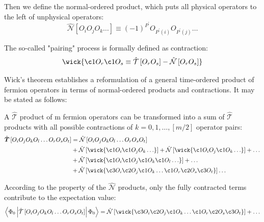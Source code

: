 Then we define the normal-ordered product, which puts all physical operators to the left of unphysical operators:
\begin{equation}
	\hat{\mathcal{N}}\left[O_{i} O_{j} O_{k} \ldots\right] \equiv(-1)^{P^{\prime}} O_{P^{\prime}(i)} O_{P^{\prime}(j)} \ldots
\end{equation}

The so-called "pairing" process is formally defined as contraction:
\begin{equation}
	\wick{
		\c1 O_{r} \c1 O_{s} \equiv \hat{\mathcal{T}}\left[O_{r} O_{s}\right]-\hat{\mathcal{N}}\left[O_{r} O_{s}\right]
	}
\end{equation}

Wick's theorem \cite{wickproof} establishes a reformulation of a general time-ordered product
of fermion operators in terms of normal-ordered products and contractions. It may be stated as follows:

A $\hat{\mathcal{T}}$ product of m fermion operators can be transformed into a sum of $\hat{\mathcal{T}}$ products with all possible contractions of $k = 0, 1, \dots, [m/2]$ operator pairs:
\begin{equation}
	\begin{aligned}
		\hat{\boldsymbol{T}}\left[O_{i} O_{j} O_{k} O_{l} \ldots O_{r} O_{s} O_{t}\right]&=
		\hat{\mathcal{N}}\left[O_{i} O_{j} O_{k} O_{l} \ldots O_{r} O_{s} O_{t}\right]
		\\
		&+\hat{\mathcal{N}}\left[\wick{\c1 O_{i} \c1 O_{j} O_{k} \ldots}\right] +\hat{\mathcal{N}}\left[\wick{\c1 O_{i} O_{j} \c1 O_{k} \ldots}\right]+\ldots
		\\
		&+\hat{\mathcal{N}}\left[\wick{\c1 O_{i} \c1 O_{j} \c1 O_{k} \c1 O_{l} \ldots}\right]+\ldots
		\\
		&+\hat{\mathcal{N}}\left[\wick{\c3 O_{i} \c2 O_{j} \c1 O_{k} \ldots \c1 O_{r} \c2 O_{s} \c3 O_{t}}\right] \ldots
	\end{aligned}
\end{equation}

According to the property of the $\hat{\mathcal{N}}$ products, only the fully contracted terms contribute to the expectation value:
\begin{equation}
	\left\langle\Phi_{0}\left|
	\hat{\mathcal{T}}\left[O_{i} O_{j} O_{k} O_{l} \ldots O_{r} O_{s} O_{t}\right]
	\right| \Phi_{0}\right\rangle
	=\hat{\mathcal{N}}\left[\wick{\c3 O_{i} \c2 O_{j} \c1 O_{k} \ldots \c1  O_{r} \c2 O_{s} \c3 O_{t}}\right]+\ldots
\end{equation}

